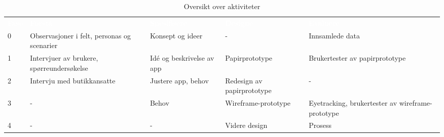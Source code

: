 \begin{table}[H]
    \caption{Oversikt over aktiviteter}
    \label{tab:prosess}
    \centering
    \begin{tabular}{|L{3em}| L{9em}|L{9em}|L{9em}|L{9em}|}
    \hline
        \textbf{\textcolor{white}{Fase}} & \textbf{\textcolor{white}{Forstå}} & \textbf{\textcolor{white}{Spesifisere}} &  \textbf{\textcolor{white}{Designe}}& \textbf{\textcolor{white}{Evaluere}}\\
        0 & Observasjoner i felt, personas og scenarier & Konsept og ideer & - & Innsamlede data\\
        1 & Intervjuer av brukere, spørreundersøkelse & Idé og beskrivelse av app & Papirprototype & Brukertester av papirprototype\\
        2 & Intervju med butikkansatte & Justere app, behov & Redesign av papirprototype & -\\
        3 & - & Behov & Wireframe-prototype & Eyetracking, brukertester av wireframe-prototype\\
        4 & - & - & Videre design & Prosess\\
        \hline
    \end{tabular}
\end{table}